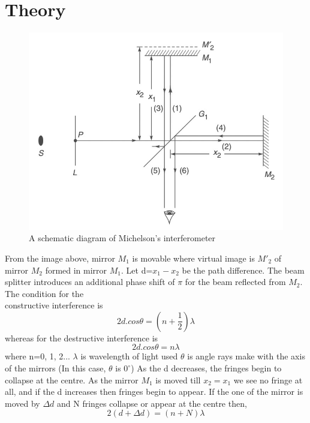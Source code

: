 \documentclass[a4paper, amsfonts, amssymb, amsmath, reprint, showkeys, nofootinbib, twoside]{revtex4-1}
\begin{document}
\section{Theory}
\begin{figure}[htbp]
\begin{center}
\includegraphics[width=6.5 cm]{d1}
\caption{A schematic diagram of Michelson's interferometer}
\label{mi}
\end{center}
\end{figure}

From the image above, mirror $M_1$ is movable where virtual image is $M'_2$ of mirror $M_2$ formed in mirror $M_1$. Let d=$x_1-x_2$ be the path difference.
The beam splitter introduces an additional phase shift of $\pi$ for the beam reflected from $M_2$. The condition for the \\constructive interference is
\begin{equation}
2d.cos\theta=\left(n+\frac{1}{2}\right)\lambda
\end{equation}
whereas for the destructive interference is \\
\begin{equation}
2d.cos\theta=n\lambda
\label{e2}
\end{equation}
where n=0, 1, 2... \newline
$\lambda$ is wavelength of light used \newline
$\theta$ is angle rays make with the axis of the mirrors (In this case, $\theta$ is $0^{\circ}$)
\newline
\newline
As the d decreases, the fringes begin to collapse at the centre. As the mirror $M_1$ is moved till $x_2=x_1$ we see no fringe at all, and if the d increases then fringes begin to appear. 
\newline
If the one of the mirror is moved by $\Delta d$ and N fringes collapse or appear at the centre then,
\begin{equation}
2(d+\Delta d)=(n+N)\lambda
\label{e3}
\end{equation}
\end{document}

